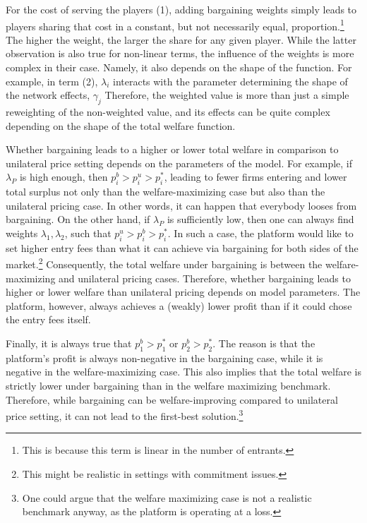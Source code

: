 For the cost of serving the players (1), adding bargaining weights simply leads to players sharing that cost in a constant, but not necessarily equal, proportion.\footnote{
    This is because this term is linear in the number of entrants.
}
The higher the weight, the larger the share for any given player.
While the latter observation is also true for non-linear terms, the influence of the weights is more complex in their case.
Namely, it also depends on the shape of the function.
For example, in term (2), $\lambda_i$ interacts with the parameter determining the shape of the network effects, $\gamma_j$
Therefore, the weighted value is more than just a simple reweighting of the non-weighted value, and its effects can be quite complex depending on the shape of the total welfare function.

Whether bargaining leads to a higher or lower total welfare in comparison to unilateral price setting depends on the parameters of the model.
For example, if $\lambda_P$ is high enough, then $p_i^b > p_i^u > p_i^*$, leading to fewer firms entering and lower total surplus not only than the welfare-maximizing case but also than the unilateral pricing case.
In other words, it can happen that everybody looses from bargaining.
On the other hand, if $\lambda_P$ is sufficiently low, then one can always find weights $\lambda_1, \lambda_2$, such that $p_i^u > p_i^b > p_i^*$.
In such a case, the platform would like to set higher entry fees than what it can achieve via bargaining for both sides of the market.\footnote{
    This might be realistic in settings with commitment issues.
}
Consequently, the total welfare under bargaining is between the welfare-maximizing and unilateral pricing cases.
Therefore, whether bargaining leads to higher or lower welfare than unilateral pricing depends on model parameters.
The platform, however, always achieves a (weakly) lower profit than if it could chose the entry fees itself.

Finally, it is always true that $p_1^b > p_1^*$ or $p_2^b > p_2^*$.
The reason is that the platform's profit is always non-negative in the bargaining case, while it is negative in the welfare-maximizing case.
This also implies that the total welfare is strictly lower under bargaining than in the welfare maximizing benchmark.
Therefore, while bargaining can be welfare-improving compared to unilateral price setting, it can not lead to the first-best solution.\footnote{
    One could argue that the welfare maximizing case is not a realistic benchmark anyway, as the platform is operating at a loss.
}

